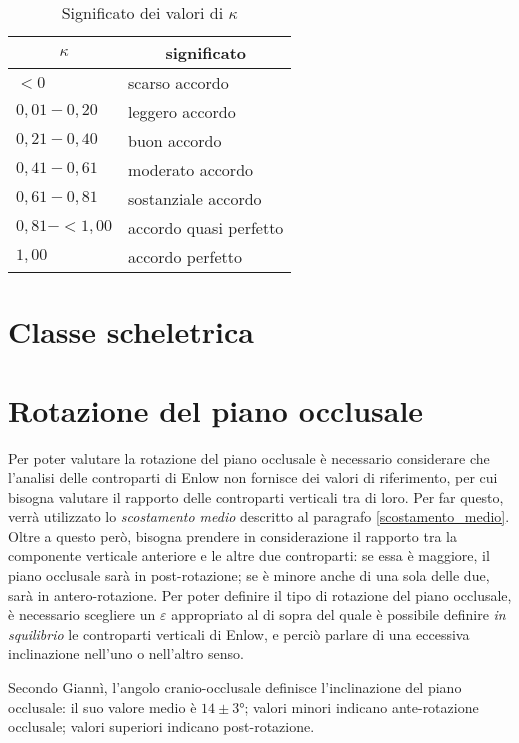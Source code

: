 \begin{table}
\centering
\caption{Significato dei valori di $\kappa$}
\label{tab:significato_kappa}
\begin{tabular}{ll}
\toprule
\multicolumn{1}{c}{\textbf{$\kappa$}} & \multicolumn{1}{c}{significato} \\
\midrule
$< 0$ & scarso accordo \\
$0,01 - 0,20$ & leggero accordo \\
$0,21 - 0,40$ & buon accordo \\
$0,41 - 0,61$ & moderato accordo \\
$0,61 - 0,81$ & sostanziale accordo \\
$0,81 - < 1,00$ & accordo quasi perfetto \\
$1,00$ & accordo perfetto \\
\bottomrule
\end{tabular}
\end{table}

\section{Classe scheletrica}

\section{Rotazione del piano occlusale}
Per poter valutare la rotazione del piano occlusale è necessario considerare che l'analisi delle controparti di Enlow non fornisce dei valori di riferimento, per cui bisogna valutare il rapporto delle controparti verticali tra di loro. Per far questo, verrà utilizzato lo \emph{scostamento medio} descritto al paragrafo \vref{scostamento_medio}. Oltre a questo però, bisogna prendere in considerazione il rapporto tra la componente verticale anteriore e le altre due controparti: se essa è maggiore, il piano occlusale sarà in post-rotazione; se è minore anche di una sola delle due, sarà in antero-rotazione. Per poter definire il tipo di rotazione del piano occlusale, è necessario scegliere un $\varepsilon$ appropriato al di sopra del quale è possibile definire \emph{in squilibrio} le controparti verticali di Enlow, e perciò parlare di una eccessiva inclinazione nell'uno o nell'altro senso.

Secondo Giannì, l'angolo cranio-occlusale definisce l'inclinazione del piano occlusale: il suo valore medio è $14 \pm 3°$; valori minori indicano ante-rotazione occlusale; valori superiori indicano post-rotazione.

